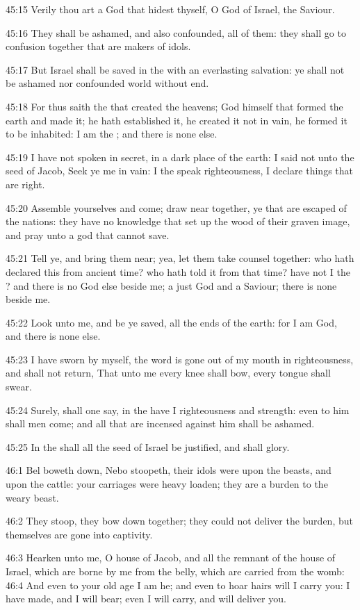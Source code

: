 45:15 Verily thou art a God that hidest thyself, O God of Israel, the Saviour.

45:16 They shall be ashamed, and also confounded, all of them: they shall go to confusion together that are makers of idols.

45:17 But Israel shall be saved in the \LORD with an everlasting salvation: ye shall not be ashamed nor confounded world without end.

45:18 For thus saith the \LORD that created the heavens; God himself that formed the earth and made it; he hath established it, he created it not in vain, he formed it to be inhabited: I am the \LORD; and there is none else.

45:19 I have not spoken in secret, in a dark place of the earth: I said not unto the seed of Jacob, Seek ye me in vain: I the \LORD speak righteousness, I declare things that are right.

45:20 Assemble yourselves and come; draw near together, ye that are escaped of the nations: they have no knowledge that set up the wood of their graven image, and pray unto a god that cannot save.

45:21 Tell ye, and bring them near; yea, let them take counsel together: who hath declared this from ancient time? who hath told it from that time?  have not I the \LORD? and there is no God else beside me; a just God and a Saviour; there is none beside me.

45:22 Look unto me, and be ye saved, all the ends of the earth: for I am God, and there is none else.

45:23 I have sworn by myself, the word is gone out of my mouth in righteousness, and shall not return, That unto me every knee shall bow, every tongue shall swear.

45:24 Surely, shall one say, in the \LORD have I righteousness and strength: even to him shall men come; and all that are incensed against him shall be ashamed.

45:25 In the \LORD shall all the seed of Israel be justified, and shall glory.

46:1 Bel boweth down, Nebo stoopeth, their idols were upon the beasts, and upon the cattle: your carriages were heavy loaden; they are a burden to the weary beast.

46:2 They stoop, they bow down together; they could not deliver the burden, but themselves are gone into captivity.

46:3 Hearken unto me, O house of Jacob, and all the remnant of the house of Israel, which are borne by me from the belly, which are carried from the womb: 46:4 And even to your old age I am he; and even to hoar hairs will I carry you: I have made, and I will bear; even I will carry, and will deliver you.

